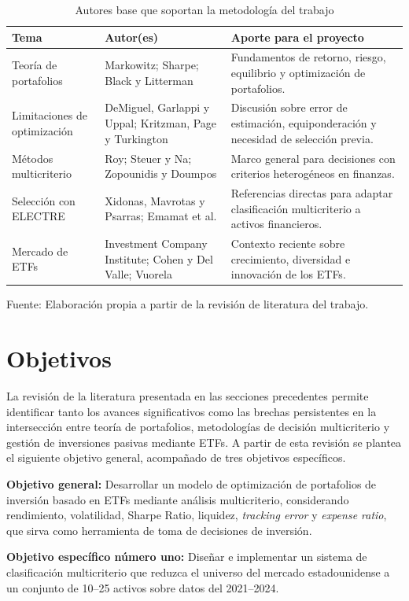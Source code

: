 \documentclass[12pt,letterpaper]{article}
\newcommand{\fuente}[1]{\begin{center}\small Fuente: #1\end{center}}
\begin{document}
\begin{longtable}{p{3.2cm}p{3.2cm}p{6.4cm}}
\caption{Autores base que soportan la metodología del trabajo}\label{tab:literatura_base}\\
\toprule
\textbf{Tema} & \textbf{Autor(es)} & \textbf{Aporte para el proyecto} \\
\midrule
Teoría de portafolios & Markowitz; Sharpe; Black y Litterman & Fundamentos de retorno, riesgo, equilibrio y optimización de portafolios. \\
Limitaciones de optimización & DeMiguel, Garlappi y Uppal; Kritzman, Page y Turkington & Discusión sobre error de estimación, equiponderación y necesidad de selección previa. \\
Métodos multicriterio & Roy; Steuer y Na; Zopounidis y Doumpos & Marco general para decisiones con criterios heterogéneos en finanzas. \\
Selección con ELECTRE & Xidonas, Mavrotas y Psarras; Emamat et al. & Referencias directas para adaptar clasificación multicriterio a activos financieros. \\
Mercado de ETFs & Investment Company Institute; Cohen y Del Valle; Vuorela & Contexto reciente sobre crecimiento, diversidad e innovación de los ETFs. \\
\bottomrule
\end{longtable}
\fuente{Elaboración propia a partir de la revisión de literatura del trabajo.}

\section{Objetivos}

La revisión de la literatura presentada en las secciones precedentes permite identificar tanto los avances significativos como las brechas persistentes en la intersección entre teoría de portafolios, metodologías de decisión multicriterio y gestión de inversiones pasivas mediante ETFs. A partir de esta revisión se plantea el siguiente objetivo general, acompañado de tres objetivos específicos.

\textbf{Objetivo general:} Desarrollar un modelo de optimización de portafolios de inversión basado en ETFs mediante análisis multicriterio, considerando rendimiento, volatilidad, Sharpe Ratio, liquidez, \textit{tracking error} y \textit{expense ratio}, que sirva como herramienta de toma de decisiones de inversión.

\textbf{Objetivo específico número uno:} Diseñar e implementar un sistema de clasificación multicriterio que reduzca el universo del mercado estadounidense a un conjunto de 10--25 activos sobre datos del 2021--2024.
\end{document}
